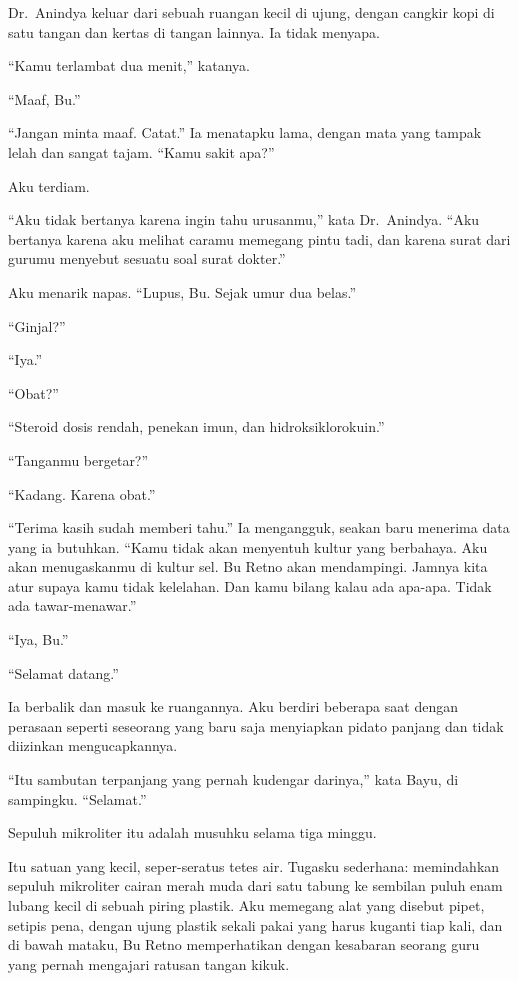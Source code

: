 \documentclass[11pt,twoside,openany]{book}
\makeatletter
\newcommand{\scenebreak}{\par\vspace{0.9em}{\centering\textsc{*\hspace{0.7em}*\hspace{0.7em}*}\par}\vspace{0.9em}\@afterindentfalse\@afterheading}
\makeatother
\begin{document}
Dr.~Anindya keluar dari sebuah ruangan kecil di ujung, dengan cangkir kopi di satu tangan dan kertas di tangan lainnya. Ia tidak menyapa.

``Kamu terlambat dua menit,'' katanya.

``Maaf, Bu.''

``Jangan minta maaf. Catat.'' Ia menatapku lama, dengan mata yang tampak lelah dan sangat tajam. ``Kamu sakit apa?''

Aku terdiam.

``Aku tidak bertanya karena ingin tahu urusanmu,'' kata Dr.~Anindya. ``Aku bertanya karena aku melihat caramu memegang pintu tadi, dan karena surat dari gurumu menyebut sesuatu soal surat dokter.''

Aku menarik napas. ``Lupus, Bu. Sejak umur dua belas.''

``Ginjal?''

``Iya.''

``Obat?''

``Steroid dosis rendah, penekan imun, dan hidroksiklorokuin.''

``Tanganmu bergetar?''

``Kadang. Karena obat.''

``Terima kasih sudah memberi tahu.'' Ia mengangguk, seakan baru menerima data yang ia butuhkan. ``Kamu tidak akan menyentuh kultur yang berbahaya. Aku akan menugaskanmu di kultur sel. Bu Retno akan mendampingi. Jamnya kita atur supaya kamu tidak kelelahan. Dan kamu bilang kalau ada apa-apa. Tidak ada tawar-menawar.''

``Iya, Bu.''

``Selamat datang.''

Ia berbalik dan masuk ke ruangannya. Aku berdiri beberapa saat dengan perasaan seperti seseorang yang baru saja menyiapkan pidato panjang dan tidak diizinkan mengucapkannya.

``Itu sambutan terpanjang yang pernah kudengar darinya,'' kata Bayu, di sampingku. ``Selamat.''

\scenebreak
Sepuluh mikroliter itu adalah musuhku selama tiga minggu.

Itu satuan yang kecil, seper-seratus tetes air. Tugasku sederhana: memindahkan sepuluh mikroliter cairan merah muda dari satu tabung ke sembilan puluh enam lubang kecil di sebuah piring plastik. Aku memegang alat yang disebut pipet, setipis pena, dengan ujung plastik sekali pakai yang harus kuganti tiap kali, dan di bawah mataku, Bu Retno memperhatikan dengan kesabaran seorang guru yang pernah mengajari ratusan tangan kikuk.
\end{document}
